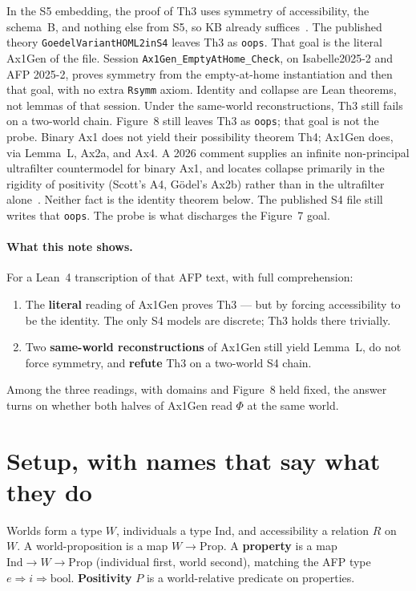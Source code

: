 \documentclass[11pt]{article}
\newcommand{\Ind}{\mathrm{Ind}}
\begin{document}
In the S5 embedding, the proof of Th3 uses symmetry of accessibility, the schema~B, and
nothing else from S5, so KB already suffices~\cite{BenzScott2025}. The published theory
\texttt{GoedelVariantHOML2inS4} leaves Th3 as \texttt{oops}. That goal is the literal Ax1Gen
of the file. Session \texttt{Ax1Gen\_EmptyAtHome\_Check}, on Isabelle2025-2 and AFP 2025-2,
proves symmetry from the empty-at-home instantiation and then that goal, with no extra
\texttt{Rsymm} axiom. Identity and collapse are Lean theorems, not lemmas of that session.
Under the same-world reconstructions, Th3 still fails on a two-world chain. Figure~8 still
leaves Th3 as \texttt{oops}; that goal is not the probe. Binary Ax1 does not yield their possibility theorem
Th4; Ax1Gen does, via Lemma~L, Ax2a, and Ax4. A 2026 comment supplies an infinite
non-principal ultrafilter countermodel for binary Ax1, and locates collapse primarily in the
rigidity of positivity (Scott's A4, G\"odel's Ax2b) rather than in the ultrafilter
alone~\cite{Benz2026arxiv}. Neither fact is the identity theorem below. The published
S4 file still writes that \texttt{oops}. The probe is what discharges the Figure~7 goal.

\paragraph{What this note shows.}
For a Lean~4 transcription of that AFP text, with full comprehension:
\begin{enumerate}
\item The \textbf{literal} reading of Ax1Gen proves Th3 --- but by forcing accessibility to
be the identity. The only S4 models are discrete; Th3 holds there trivially.
\item Two \textbf{same-world reconstructions} of Ax1Gen still yield Lemma~L, do not force
symmetry, and \textbf{refute} Th3 on a two-world S4 chain.
\end{enumerate}
Among the three readings, with domains and Figure~8 held fixed, the answer turns on whether
both halves of Ax1Gen read \(\Phi\) at the same world.

\section{Setup, with names that say what they do}

Worlds form a type \(W\), individuals a type \(\Ind\), and accessibility a relation \(R\)
on \(W\). A world-proposition is a map \(W \to \mathrm{Prop}\). A \textbf{property} is a
map \(\Ind \to W \to \mathrm{Prop}\) (individual first, world second), matching the AFP
type \(e \Rightarrow i \Rightarrow \mathrm{bool}\). \textbf{Positivity} \(P\) is a
world-relative predicate on properties.
\end{document}
